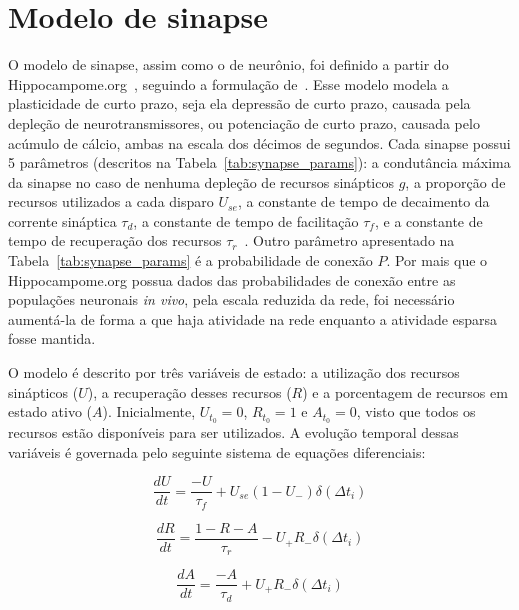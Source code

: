 

\section{Modelo de sinapse}

O modelo de sinapse, assim como o de neurônio, foi definido a partir do Hippocampome.org~\cite{wheelerHippocampomeorg2023},
seguindo a formulação de~. Esse modelo modela a plasticidade de curto prazo,
seja ela depressão de curto prazo, causada pela depleção de neurotransmissores, ou potenciação de curto prazo, causada pelo
acúmulo de cálcio, ambas na escala dos décimos de segundos. Cada sinapse possui 5 parâmetros (descritos na
Tabela~\ref{tab:synapse_params}): a condutância máxima da sinapse no caso de nenhuma depleção de recursos sinápticos $g$, a
proporção de recursos utilizados a cada disparo $U_{se}$, a constante de tempo de decaimento da corrente sináptica $\tau_d$, a
constante de tempo de facilitação $\tau_f$, e a constante de tempo de recuperação dos recursos
$\tau_r$~\cite{moradiNormalized2022}. Outro parâmetro apresentado na Tabela~\ref{tab:synapse_params} é a probabilidade de conexão
$P$. Por mais que o Hippocampome.org possua dados das probabilidades de conexão entre as populações neuronais \textit{in vivo},
pela escala reduzida da rede, foi necessário aumentá-la de forma a que haja atividade na rede enquanto a atividade esparsa fosse
mantida.

O modelo é descrito por três variáveis de estado: a utilização dos recursos sinápticos ($U$), a recuperação desses recursos ($R$)
e a porcentagem de recursos em estado ativo ($A$). Inicialmente, $U_{t_0} = 0$, $R_{t_0} = 1$ e $A_{t_0} = 0$, 
visto que todos os recursos estão disponíveis para ser utilizados. A evolução temporal dessas
variáveis é governada pelo seguinte sistema de equações diferenciais:

\begin{equation}
    \label{eq_tsodyks_dU}
    \frac{dU}{dt} = \frac{-U}{\tau_f} + U_{se}(1-U_{-}) \delta(\Delta t_i)
\end{equation}

\begin{equation}
    \label{eq_tsodyks_dR}
    \frac{dR}{dt} = \frac{1-R-A}{\tau_r} - U_{+} R_{-} \delta(\Delta t_i)
\end{equation}

\begin{equation}
    \label{eq_tsodyks_dA}
    \frac{dA}{dt} = \frac{-A}{\tau_d} + U_{+} R_{-} \delta(\Delta t_i)
\end{equation}

